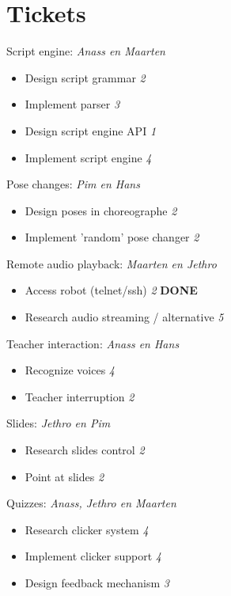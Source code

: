 \documentclass[a4paper,10pt]{report}
\begin{document}
\section{Tickets}
\begin{description}
	\item Script engine: \textit{Anass en Maarten}
		\begin{itemize}
			\item Design script grammar \textit{2}
			\item Implement parser \textit{3}
			\item Design script engine API \textit{1}
			\item Implement script engine \textit{4}
		\end{itemize}
	\item Pose changes: \textit{Pim en Hans}
		\begin{itemize}
			\item Design poses in choreographe \textit{2}
			\item Implement 'random' pose changer \textit{2}
		\end{itemize}
	\item Remote audio playback: \textit{Maarten en Jethro}
		\begin{itemize}
			\item Access robot (telnet/ssh) \textit{2} \textbf{DONE}
			\item Research audio streaming / alternative \textit{5}
		\end{itemize}
	\item Teacher interaction: \textit{Anass en Hans}
		\begin{itemize}
			\item Recognize voices \textit{4}
			\item Teacher interruption \textit{2}
		\end{itemize}
	\item Slides: \textit{Jethro en Pim}
		\begin{itemize}
			\item Research slides control \textit{2}
			\item Point at slides \textit{2}
		\end{itemize}
	\item Quizzes: \textit{Anass, Jethro en Maarten}
		\begin{itemize}
			\item Research clicker system \textit{4}
			\item Implement clicker support \textit{4}
			\item Design feedback mechanism \textit{3}

\end{itemize}
\end{description}
\end{document}
